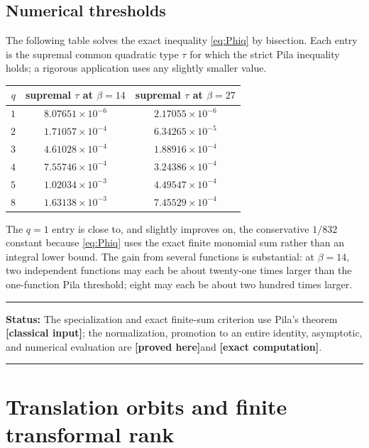 \documentclass[11pt,oneside]{article}
\theoremstyle{definition}
\theoremstyle{remark}
\newcommand{\statusproved}{\textcolor{provedgreen}{\textbf{[proved here]}}}
\newcommand{\statusclassical}{\textcolor{classicalblue}{\textbf{[classical input]}}}
\newcommand{\statuscomputed}{\textcolor{openviolet}{\textbf{[exact computation]}}}
\newenvironment{statusbox}[1]
{\begin{center}\begin{minipage}{0.94\textwidth}\raggedright\hrule\vspace{0.45em}\textbf{Status:} #1\par\vspace{0.35em}}
{\vspace{0.35em}\hrule\end{minipage}\end{center}}
\begin{document}
\subsection{Numerical thresholds}

The following table solves the exact inequality \eqref{eq:Phiq} by bisection.  Each entry
is the supremal common quadratic type $\tau$ for which the strict Pila inequality holds;
a rigorous application uses any slightly smaller value.

\begin{center}
\begin{tabular}{@{}rcc@{}}
\toprule
$q$ & supremal $\tau$ at $\beta=14$ & supremal $\tau$ at $\beta=27$\\
\midrule
$1$ & $8.07651\times10^{-6}$ & $2.17055\times10^{-6}$\\
$2$ & $1.71057\times10^{-4}$ & $6.34265\times10^{-5}$\\
$3$ & $4.61028\times10^{-4}$ & $1.88916\times10^{-4}$\\
$4$ & $7.55746\times10^{-4}$ & $3.24386\times10^{-4}$\\
$5$ & $1.02034\times10^{-3}$ & $4.49547\times10^{-4}$\\
$8$ & $1.63138\times10^{-3}$ & $7.45529\times10^{-4}$\\
\bottomrule
\end{tabular}
\end{center}

The $q=1$ entry is close to, and slightly improves on, the conservative
$1/832$ constant because \eqref{eq:Phiq} uses the exact finite monomial sum rather than an
integral lower bound.  The gain from several functions is substantial: at $\beta=14$, two
independent functions may each be about twenty-one times larger than the one-function Pila
threshold; eight may each be about two hundred times larger.

\begin{statusbox}{The specialization and exact finite-sum criterion use Pila's theorem
\statusclassical; the normalization, promotion to an entire identity, asymptotic, and
numerical evaluation are \statusproved and \statuscomputed.}
\end{statusbox}

\section{Translation orbits and finite transformal rank}
\label{sec:translationrank}
\end{document}
